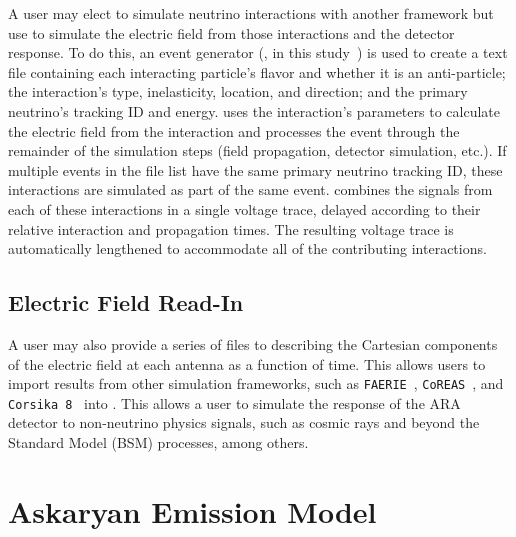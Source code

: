             A user may elect to simulate neutrino interactions with another framework but use \arasim{} to simulate the electric field from those interactions and the detector response.
            To do this, an event generator (\nuleptonsim{}, in this study~\citep{nuleptonsim}) is used to create a text file containing each interacting particle's flavor and whether it is an anti-particle; the interaction's type, inelasticity, location, and direction; and the primary neutrino's tracking ID and energy.
            \arasim{} uses the interaction's parameters to calculate the electric field from the interaction and processes the event through the
            remainder of the simulation steps (field propagation, detector simulation, etc.).
            If multiple events in the file list have the same primary neutrino tracking ID, these interactions are simulated as part of the same event.
            \arasim{} combines the signals from each of these interactions in a single voltage trace, delayed according to their relative interaction and propagation times.
            The resulting voltage trace is automatically lengthened to accommodate all of the contributing interactions.
        
        \subsection{Electric Field Read-In}

            A user may also provide a series of files to \arasim{} describing the Cartesian components of the electric field at each antenna as a function of time.
            This allows users to import results from other simulation frameworks, such as \texttt{FAERIE}~\citep{FAERIE}, \texttt{CoREAS}~\citep{COREAS}, and \texttt{Corsika~8}~\citep{corsika8} into \arasim{}.
            This allows a user to simulate the response of the
            ARA detector to non-neutrino physics signals,
            such as cosmic rays and beyond the Standard Model (BSM) processes, among others.

    \section{Askaryan Emission Model} \label{app:askaryan_model}

